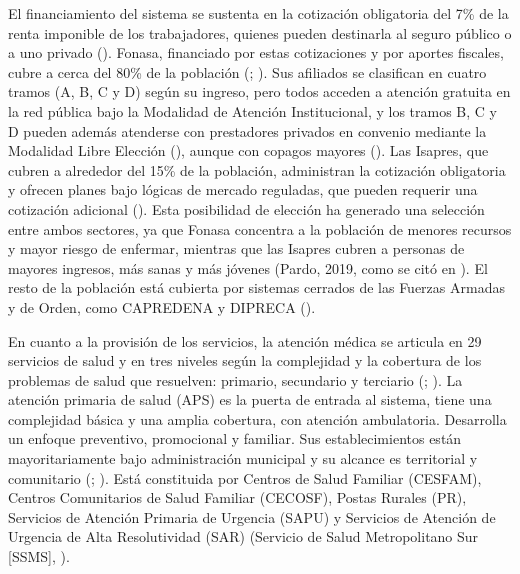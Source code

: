 \documentclass[
  spanish,
  a4paper,
  oneside]{scrbook}
\begin{document}
El financiamiento del sistema se sustenta en la cotización obligatoria
del 7\% de la renta imponible de los trabajadores, quienes pueden
destinarla al seguro público o a uno privado
(). Fonasa, financiado por estas cotizaciones y por aportes
fiscales, cubre a cerca del 80\% de la población
(;
). Sus afiliados se
clasifican en cuatro tramos (A, B, C y D) según su ingreso, pero todos
acceden a atención gratuita en la red pública bajo la Modalidad de
Atención Institucional, y los tramos B, C y D pueden además atenderse
con prestadores privados en convenio mediante la Modalidad Libre
Elección (), aunque con copagos mayores
(). Las Isapres, que
cubren a alrededor del 15\% de la población, administran la cotización
obligatoria y ofrecen planes bajo lógicas de mercado reguladas, que
pueden requerir una cotización adicional
(). Esta
posibilidad de elección ha generado una selección entre ambos sectores,
ya que Fonasa concentra a la población de menores recursos y mayor
riesgo de enfermar, mientras que las Isapres cubren a personas de
mayores ingresos, más sanas y más jóvenes (Pardo, 2019, como se citó en
). El resto de
la población está cubierta por sistemas cerrados de las Fuerzas Armadas
y de Orden, como CAPREDENA y DIPRECA
().

En cuanto a la provisión de los servicios, la atención médica se
articula en 29 servicios de salud y en tres niveles según la complejidad
y la cobertura de los problemas de salud que resuelven: primario,
secundario y terciario (; ). La atención primaria de salud (APS) es la puerta de entrada al
sistema, tiene una complejidad básica y una amplia cobertura, con
atención ambulatoria. Desarrolla un enfoque preventivo, promocional y
familiar. Sus establecimientos están mayoritariamente bajo
administración municipal y su alcance es territorial y comunitario
(;
). Está constituida por
Centros de Salud Familiar (CESFAM), Centros Comunitarios de Salud
Familiar (CECOSF), Postas Rurales (PR), Servicios de Atención Primaria
de Urgencia (SAPU) y Servicios de Atención de Urgencia de Alta
Resolutividad (SAR) (Servicio de Salud Metropolitano Sur {[}SSMS{]},
).
\end{document}
